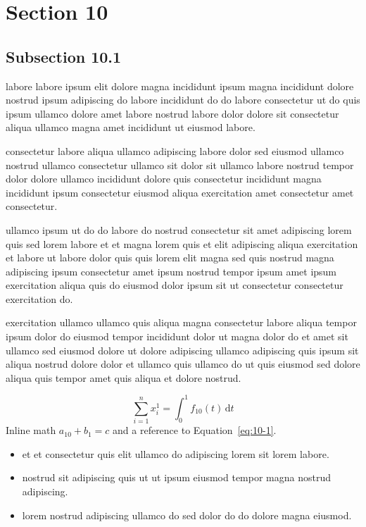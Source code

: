 \documentclass{article}
\begin{document}
\section{Section 10}\label{sec:10}
\subsection{Subsection 10.1}\label{sec:10-1}
labore labore ipsum elit dolore magna incididunt ipsum magna incididunt dolore nostrud ipsum adipiscing do labore incididunt do do labore consectetur ut do quis ipsum ullamco dolore amet labore nostrud labore dolor dolore sit consectetur aliqua ullamco magna amet incididunt ut eiusmod labore.

consectetur labore aliqua ullamco adipiscing labore dolor sed eiusmod ullamco nostrud ullamco consectetur ullamco sit dolor sit ullamco labore nostrud tempor dolor dolore ullamco incididunt dolore quis consectetur incididunt magna incididunt ipsum consectetur eiusmod aliqua exercitation amet consectetur amet consectetur.

ullamco ipsum ut do do labore do nostrud consectetur sit amet adipiscing lorem quis sed lorem labore et et magna lorem quis et elit adipiscing aliqua exercitation et labore ut labore dolor quis quis lorem elit magna sed quis nostrud magna adipiscing ipsum consectetur amet ipsum nostrud tempor ipsum amet ipsum exercitation aliqua quis do eiusmod dolor ipsum sit ut consectetur consectetur exercitation do.

exercitation ullamco ullamco quis aliqua magna consectetur labore aliqua tempor ipsum dolor do eiusmod tempor incididunt dolor ut magna dolor do et amet sit ullamco sed eiusmod dolore ut dolore adipiscing ullamco adipiscing quis ipsum sit aliqua nostrud dolore dolor et ullamco quis ullamco do ut quis eiusmod sed dolore aliqua quis tempor amet quis aliqua et dolore nostrud.

\begin{equation}\label{eq:10-1}
  \sum_{i=1}^{n} x_i^{1} = \int_0^1 f_{10}(t)\,\mathrm{d}t
\end{equation}
Inline math $a_{10} + b_{1} = c$ and a reference to Equation~\eqref{eq:10-1}.

\begin{itemize}
  \item et et consectetur quis elit ullamco do adipiscing lorem sit lorem labore.
  \item nostrud sit adipiscing quis ut ut ipsum eiusmod tempor magna nostrud adipiscing.
  \item lorem nostrud adipiscing ullamco do sed dolor do do dolore magna eiusmod.
\end{itemize}
\end{document}
